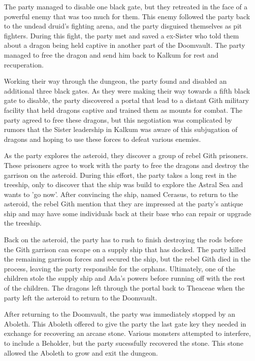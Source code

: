 The party managed to disable one black gate, but they retreated in the face of a powerful enemy that was too much for them.
This enemy followed the party back to the undead druid's fighting arena, and the party disguised themselves as pit fighters.
During this fight, the party met and saved a ex-Sister who told them about a dragon being held captive in another part of the Doomvault.
The party managed to free the dragon and send him back to Kalkum for rest and recuperation.

Working their way through the dungeon, the party found and disabled an additional three black gates.
As they were making their way towards a fifth black gate to disable, the party discovered a portal that lead to a distant Gith military facility that held dragons captive and trained them as mounts for combat.
The party agreed to free these dragons, but this negotiation was complicated by rumors that the Sister leadership in Kalkum was aware of this subjugation of dragons and hoping to use these forces to defeat various enemies.

As the party explores the asteroid, they discover a group of rebel Gith prisoners.
These prisoners agree to work with the party to free the dragons and destroy the garrison on the asteroid.
During this effort, the party takes a long rest in the treeship, only to discover that the ship was build to explore the Astral Sea and wants to 'go now'.
After convincing the ship, named Cerasus, to return to the asteroid, the rebel Gith mention that they are impressed at the party's antique ship and may have some individuals back at their base who can repair or upgrade the treeship.

Back on the asteroid, the party has to rush to finish destroying the rods before the Gith garrison can escape on a supply ship that has docked.
The party killed the remaining garrison forces and secured the ship, but the rebel Gith died in the process, leaving the party responsible for the orphans.
Ultimately, one of the children stole the supply ship and Ada's powers before running off with the rest of the children.
The dragons left through the portal back to Theaceae when the party left the asteroid to return to the Doomvault.

After returning to the Doomvault, the party was immediately stopped by an Aboleth.
This Aboleth offered to give the party the last gate key they needed in exchange for recovering an arcane stone.
Various monsters attempted to interfere, to include a Beholder, but the party sucessfully recovered the stone.
This stone allowed the Aboleth to grow and exit the dungeon.

